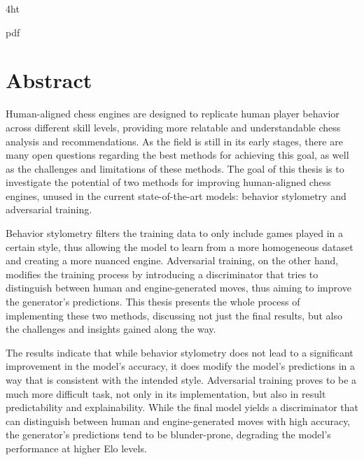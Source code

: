 \documentclass[
  a4paper,  %
  twoside,  %
  bibliography=totoc,
  headsepline,
  cleardoublepage=empty,
  parskip=half,
  draft=false
]{scrbook}
\begin{document}
\iftex4ht
  \Configure{$}{\PicMath}{\EndPicMath}{}

  {pdf}
  {%
  }
\fi



\Titelblatt

\pagestyle{preamble}
\renewcommand*{\chapterpagestyle}{preamble}



\section*{Abstract}
Human-aligned chess engines are designed to replicate human player behavior across different skill levels, providing more relatable and understandable chess analysis and recommendations.
As the field is still in its early stages, there are many open questions regarding the best methods for achieving this goal, as well as the challenges and limitations of these methods.
The goal of this thesis is to investigate the potential of two methods for improving human-aligned chess engines, unused in the current state-of-the-art models: behavior stylometry and adversarial training.

Behavior stylometry filters the training data to only include games played in a certain style, thus allowing the model to learn from a more homogeneous dataset and creating a more nuanced engine.
Adversarial training, on the other hand, modifies the training process by introducing a discriminator that tries to distinguish between human and engine-generated moves, thus aiming to improve the generator's predictions.
This thesis presents the whole process of implementing these two methods, discussing not just the final results, but also the challenges and insights gained along the way.

The results indicate that while behavior stylometry does not lead to a significant improvement in the model's accuracy, it does modify the model's predictions in a way that is consistent with the intended style.
Adversarial training proves to be a much more difficult task, not only in its implementation, but also in result predictability and explainability.
While the final model yields a discriminator that can distinguish between human and engine-generated moves with high accuracy, the generator's predictions tend to be blunder-prone, degrading the model's performance at higher Elo levels.
\end{document}
